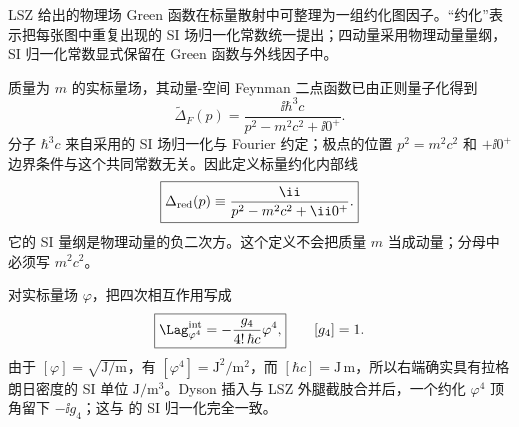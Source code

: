 
LSZ 给出的物理场 Green 函数在标量散射中可整理为一组约化图因子。“约化”表示把每张图中重复出现的 SI 场归一化常数统一提出；四动量采用物理动量量纲，SI 归一化常数显式保留在 Green 函数与外线因子中。

质量为 $m$ 的实标量场，其动量-空间 Feynman 二点函数已由正则量子化得到
\begin{equation}
 \widetilde\Delta_F(p)
 =\frac{\ii\hbar^3c}{p^2-m^2c^2+\ii0^+}.
 \label{eq:scalar-physical-propagator-common-r15}
\end{equation}
分子 $\hbar^3c$ 来自采用的 SI 场归一化与 Fourier 约定；极点的位置 $p^2=m^2c^2$ 和 $+\ii0^+$ 边界条件与这个共同常数无关。因此定义标量约化内部线
\begin{equation}
 \boxed{
 \Delta_{\rm red}(p)
 \equiv\frac{\ii}{p^2-m^2c^2+\ii0^+}.}
 \label{eq:scalar-reduced-propagator-common-r15}
\end{equation}
它的 SI 量纲是物理动量的负二次方。这个定义不会把质量 $m$ 当成动量；分母中必须写 $m^2c^2$。


对实标量场 $\varphi$，把四次相互作用写成
\begin{equation}
 \boxed{
 \Lag_{\varphi^4}^{\rm int}
 =-\frac{g_4}{4!\,\hbar c}\varphi^4,}
 \qquad [g_4]=1.
 \label{eq:phi4-si-coupling-common-r15}
\end{equation}
由于 $[\varphi]=\sqrt{\mathrm{J/m}}$，有 $[\varphi^4]=\mathrm{J^2/m^2}$，而 $[\hbar c]=\mathrm{J\,m}$，所以右端确实具有拉格朗日密度的 SI 单位 $\mathrm{J/m^3}$。Dyson 插入与 LSZ 外腿截肢合并后，一个约化 $\varphi^4$ 顶角留下 $-\ii g_4$；这与  的 SI 归一化完全一致。

